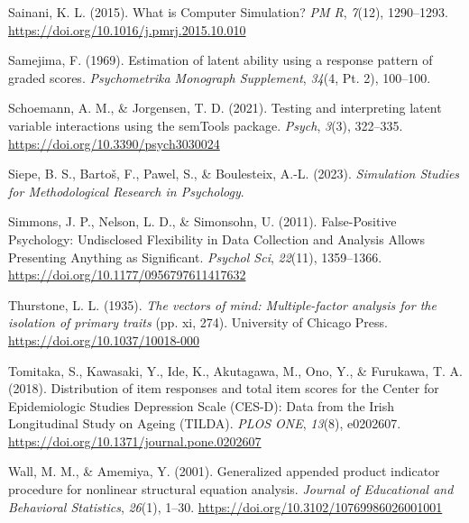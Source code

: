 \documentclass[
  man]{apa6}
\newlength{\cslhangindent}
\newlength{\cslentryspacingunit} %
\newenvironment{CSLReferences}[2] %
 {%
  \setlength{\parindent}{0pt}
  \ifodd #1
  \let\oldpar\par
  \def\par{\hangindent=\cslhangindent\oldpar}
  \fi
  \setlength{\parskip}{#2\cslentryspacingunit}
 }%
 {}
\begin{document}
\begin{CSLReferences}{1}{0}
\leavevmode{}%
Sainani, K. L. (2015). What is {Computer Simulation}? \emph{PM R}, \emph{7}(12), 1290--1293. \url{https://doi.org/10.1016/j.pmrj.2015.10.010}

\leavevmode{}%
Samejima, F. (1969). Estimation of latent ability using a response pattern of graded scores. \emph{Psychometrika Monograph Supplement}, \emph{34}(4, Pt. 2), 100--100.

\leavevmode{}%
Schoemann, A. M., \& Jorgensen, T. D. (2021). Testing and interpreting latent variable interactions using the {semTools} package. \emph{Psych}, \emph{3}(3), 322--335. \url{https://doi.org/10.3390/psych3030024}

\leavevmode{}%
Siepe, B. S., Bartoš, F., Pawel, S., \& Boulesteix, A.-L. (2023). \emph{Simulation {Studies} for {Methodological Research} in {Psychology}}.

\leavevmode{}%
Simmons, J. P., Nelson, L. D., \& Simonsohn, U. (2011). False-{Positive Psychology}: {Undisclosed Flexibility} in {Data Collection} and {Analysis Allows Presenting Anything} as {Significant}. \emph{Psychol Sci}, \emph{22}(11), 1359--1366. \url{https://doi.org/10.1177/0956797611417632}

\leavevmode{}%
Thurstone, L. L. (1935). \emph{The vectors of mind: {Multiple-factor} analysis for the isolation of primary traits} (pp. xi, 274). University of Chicago Press. \url{https://doi.org/10.1037/10018-000}

\leavevmode{}%
Tomitaka, S., Kawasaki, Y., Ide, K., Akutagawa, M., Ono, Y., \& Furukawa, T. A. (2018). Distribution of item responses and total item scores for the {Center} for {Epidemiologic Studies Depression Scale} ({CES-D}): {Data} from the {Irish Longitudinal Study} on {Ageing} ({TILDA}). \emph{PLOS ONE}, \emph{13}(8), e0202607. \url{https://doi.org/10.1371/journal.pone.0202607}

\leavevmode{}%
Wall, M. M., \& Amemiya, Y. (2001). Generalized appended product indicator procedure for nonlinear structural equation analysis. \emph{Journal of Educational and Behavioral Statistics}, \emph{26}(1), 1--30. \url{https://doi.org/10.3102/10769986026001001}


\end{CSLReferences}
\end{document}
